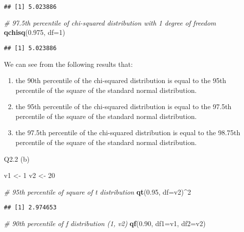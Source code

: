 \documentclass[
]{article}
\newenvironment{Shaded}{\begin{snugshade}}{\end{snugshade}}
\newcommand{\AttributeTok}[1]{\textcolor[rgb]{0.13,0.29,0.53}{#1}}
\newcommand{\CommentTok}[1]{\textcolor[rgb]{0.56,0.35,0.01}{\textit{#1}}}
\newcommand{\DecValTok}[1]{\textcolor[rgb]{0.00,0.00,0.81}{#1}}
\newcommand{\FloatTok}[1]{\textcolor[rgb]{0.00,0.00,0.81}{#1}}
\newcommand{\FunctionTok}[1]{\textcolor[rgb]{0.13,0.29,0.53}{\textbf{#1}}}
\newcommand{\NormalTok}[1]{#1}
\newcommand{\OtherTok}[1]{\textcolor[rgb]{0.56,0.35,0.01}{#1}}
\newcommand{\SpecialCharTok}[1]{\textcolor[rgb]{0.81,0.36,0.00}{\textbf{#1}}}
\begin{document}
\begin{verbatim}
## [1] 5.023886
\end{verbatim}

\begin{Shaded}
\begin{Highlighting}[]
\CommentTok{\# 97.5th percentile of chi{-}squared distribution with 1 degree of freedom}
\FunctionTok{qchisq}\NormalTok{(}\FloatTok{0.975}\NormalTok{, }\AttributeTok{df=}\DecValTok{1}\NormalTok{)}
\end{Highlighting}
\end{Shaded}

\begin{verbatim}
## [1] 5.023886
\end{verbatim}

We can see from the following results that:

\begin{enumerate}
\def\labelenumi{\arabic{enumi}.}
\item
  the 90th percentile of the chi-squared distribution is equal to the
  95th percentile of the square of the standard normal distribution.
\item
  the 95th percentile of the chi-squared distribution is equal to the
  97.5th percentile of the square of the standard normal distribution.
\item
  the 97.5th percentile of the chi-squared distribution is equal to the
  98.75th percentile of the square of the standard normal distribution.
\end{enumerate}

Q2.2 (b)

\begin{Shaded}
\begin{Highlighting}[]
\NormalTok{v1 }\OtherTok{\textless{}{-}} \DecValTok{1}
\NormalTok{v2 }\OtherTok{\textless{}{-}} \DecValTok{20}

\CommentTok{\# 95th percentile of square of t distribution}
\FunctionTok{qt}\NormalTok{(}\FloatTok{0.95}\NormalTok{, }\AttributeTok{df=}\NormalTok{v2)}\SpecialCharTok{\^{}}\DecValTok{2}
\end{Highlighting}
\end{Shaded}

\begin{verbatim}
## [1] 2.974653
\end{verbatim}

\begin{Shaded}
\begin{Highlighting}[]
\CommentTok{\# 90th percentile of f distribution (1, v2)}
\FunctionTok{qf}\NormalTok{(}\FloatTok{0.90}\NormalTok{, }\AttributeTok{df1=}\NormalTok{v1, }\AttributeTok{df2=}\NormalTok{v2)}
\end{Highlighting}
\end{Shaded}
\end{document}
